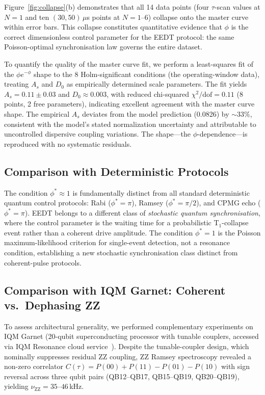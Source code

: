 \documentclass[10pt,twocolumn]{article}
\newcommand{\nuZZ}{\nu_{\mathrm{ZZ}}}
\begin{document}
Figure~\ref{fig:collapse}(b) demonstrates that all 14 data points
(four $\tau$-scan values at $N=1$ and ten $(30,50)\,\mu$s points
at $N=1$--6) collapse onto the master curve within error bars.
This collapse constitutes quantitative evidence that $\phi$
is the correct dimensionless control parameter for the EEDT protocol:
the same Poisson-optimal synchronisation law governs the entire
dataset.

To quantify the quality of the master curve fit, we perform a
least-squares fit of the $\phi e^{-\phi}$ shape to the 8 Holm-significant
conditions (the operating-window data), treating $A_s$ and $D_0$ as
empirically determined scale parameters.
The fit yields $A_s = 0.11\pm0.03$ and $D_0 \approx 0.003$,
with reduced chi-squared $\chi^2/\mathrm{dof} = 0.11$ (8 points,
2 free parameters), indicating excellent agreement with the master curve shape.
The empirical $A_s$ deviates from the model prediction (0.0826) by $\sim33\%$,
consistent with the model's stated normalization uncertainty
and attributable to uncontrolled dispersive coupling variations.
The shape---the $\phi$-dependence---is reproduced with no systematic residuals.

\subsection{Comparison with Deterministic Protocols}
\label{subsec:comparison}

The condition $\phi^*\approx1$ is fundamentally distinct from
all standard deterministic quantum control protocols:
Rabi ($\phi^*=\pi$), Ramsey ($\phi^*=\pi/2$),
and CPMG echo ($\phi^*=\pi$).
EEDT belongs to a different class of
\emph{stochastic quantum synchronisation}, where the control parameter
is the waiting time for a probabilistic T$_1$-collapse event
rather than a coherent drive amplitude.
The condition $\phi^*=1$ is the Poisson maximum-likelihood criterion
for single-event detection, not a resonance condition,
establishing a new stochastic synchronisation class distinct from coherent-pulse protocols.

\subsection{Comparison with IQM Garnet: Coherent vs.\ Dephasing ZZ}
\label{sec:iqm}

To assess architectural generality, we performed complementary experiments
on IQM Garnet (20-qubit superconducting processor with tunable couplers,
accessed via IQM Resonance cloud service~\cite{IQMResonance2026}).
Despite the tunable-coupler design, which nominally suppresses residual ZZ
coupling, ZZ Ramsey spectroscopy revealed a non-zero correlator
$C(\tau)=P(00)+P(11)-P(01)-P(10)$ with sign reversal across three qubit
pairs (QB12--QB17, QB15--QB19, QB20--QB19), yielding
$\nuZZ = 35$--$46$\,kHz.
\end{document}
